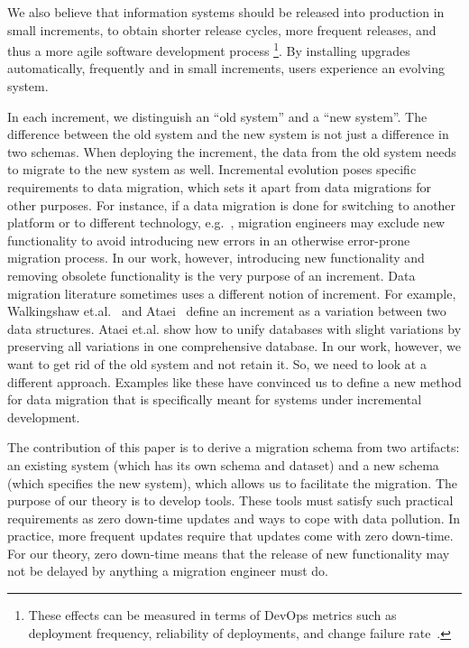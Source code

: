 \documentclass{elsarticle}
\begin{document}
   We also believe that information systems should be released into production in small increments,
   to obtain shorter release cycles, more frequent releases, and thus a more agile software development process%
   \footnote{These effects can be measured in terms of DevOps metrics such as
   deployment frequency,
   reliability of deployments, and
   change failure rate~\cite{DevOps2021}.}.
   By installing upgrades automatically, frequently and in small increments,
   users experience an evolving system.

   In each increment, we distinguish an ``old system'' and a ``new system''.
   The difference between the old system and the new system is not just a difference in two schemas.
   When deploying the increment, the data from the old system needs to migrate to the new system as well.
   Incremental evolution poses specific requirements to data migration,
   which sets it apart from data migrations for other purposes.
   For instance, if a data migration is done for switching to another platform or to different technology,
   e.g.~\cite{Gholami2016,Bisbal1999},
   migration engineers may exclude new functionality to avoid introducing new errors in an otherwise error-prone migration process.
   In our work, however, introducing new functionality and removing obsolete functionality is the very purpose of an increment.
   Data migration literature sometimes uses a different notion of increment.
   For example, Walkingshaw et.al.~\cite{Walkingshaw2014} and Ataei~\cite{Ataei2021} define an increment as a variation between two data structures.
   Ataei et.al. show how to unify databases with slight variations by preserving all variations in one comprehensive database.
   In our work, however, we want to get rid of the old system and not retain it.
   So, we need to look at a different approach.
   Examples like these have convinced us to define a new method for data migration that is specifically meant for systems under incremental development.
   
   The contribution of this paper is to derive a migration schema from two artifacts: an existing system
   (which has its own schema and dataset) and a new schema (which specifies the new system),
   which allows us to facilitate the migration.
   The purpose of our theory is to develop tools.
   These tools must satisfy such practical requirements as
   zero down-time updates and ways to cope with data pollution.
   In practice, more frequent updates require that updates come with zero down-time.
   For our theory, zero down-time means that the release of new functionality may not be delayed by anything a migration engineer must do.
   
\end{document}
